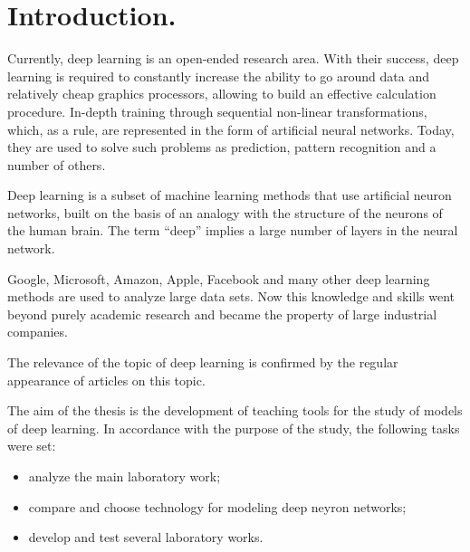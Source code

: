 \section{Introduction.}

\par Currently, deep learning is an open-ended research area. With their success, deep learning is required to constantly increase the ability to go around data and relatively cheap graphics processors, allowing to build an effective calculation procedure.
In-depth training through sequential non-linear transformations, which, as a rule, are represented in the form of artificial neural networks. Today, they are used to solve such problems as prediction, pattern recognition and a number of others.
\par Deep learning is a subset of machine learning methods that use artificial neuron networks, built on the basis of an analogy with the structure of the neurons of the human brain. The term “deep” implies a large number of layers in the neural network.
\par Google, Microsoft, Amazon, Apple, Facebook and many other deep learning methods are used to analyze large data sets. Now this knowledge and skills went beyond purely academic research and became the property of large industrial companies.
\par The relevance of the topic of deep learning is confirmed by the regular appearance of articles on this topic.

\par The aim of the thesis is the development of teaching tools for the study of models of deep learning. In accordance with the purpose of the study, the following tasks were set:
\begin{itemize}
    \item analyze the main laboratory work;
    \item compare and choose technology for modeling deep neyron
networks;
    \item develop and test several laboratory works.
    \end{itemize}